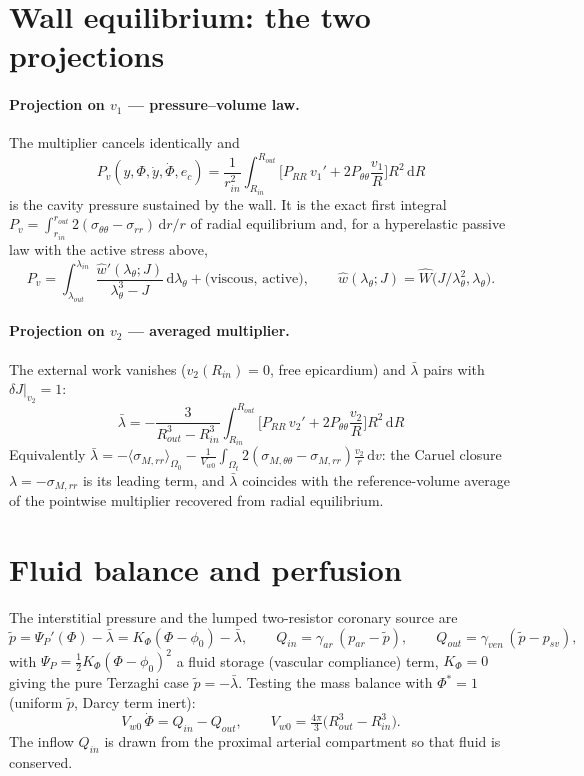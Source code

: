 \documentclass[11pt,a4paper]{article}
\newcommand{\dd}{\mathrm d}
\newcommand{\Rin}{R_{in}}
\newcommand{\Rout}{R_{out}}
\newcommand{\rin}{r_{in}}
\newcommand{\lt}{\lambda_\theta}
\newcommand{\lb}{\bar\lambda}
\newcommand{\pf}{\tilde p}
\newcommand{\Vw}{V_{w0}}
\begin{document}
\section{Wall equilibrium: the two projections}

\paragraph{Projection on $v_1$ --- pressure--volume law.} The multiplier cancels identically and
\begin{equation}
\boxed{\;P_v(y,\Phi,\dot y,\dot\Phi,e_c)=\frac1{\rin^2}\int_{\Rin}^{\Rout}\Big[P_{RR}\,v_1'+2P_{\theta\theta}\frac{v_1}{R}\Big]R^2\,\dd R\;}
\label{eq:pv}
\end{equation}
is the cavity pressure sustained by the wall. It is the exact first integral $P_v=\int_{\rin}^{r_{out}}2(\sigma_{\theta\theta}-\sigma_{rr})\,\dd r/r$ of radial equilibrium and, for a hyperelastic passive law with the active stress above,
\[
P_v=\int_{\lambda_{out}}^{\lambda_{in}}\frac{\widehat w'(\lt;J)}{\lt^3-J}\,\dd\lt+\text{(viscous, active)},\qquad \widehat w(\lt;J)=\widehat W\!\big(J/\lt^2,\lt\big).
\]
\paragraph{Projection on $v_2$ --- averaged multiplier.} The external work vanishes ($v_2(\Rin)=0$, free epicardium) and $\lb$ pairs with $\delta J|_{v_2}=1$:
\begin{equation}
\boxed{\;\lb=-\frac{3}{\Rout^3-\Rin^3}\int_{\Rin}^{\Rout}\Big[P_{RR}\,v_2'+2P_{\theta\theta}\frac{v_2}{R}\Big]R^2\,\dd R\;}
\label{eq:lambda}
\end{equation}
Equivalently $\lb=-\langle\sigma_{M,rr}\rangle_{\Omega_0}-\frac1{\Vw}\int_{\Omega_t}2(\sigma_{M,\theta\theta}-\sigma_{M,rr})\frac{v_2}{r}\,\dd v$: the Caruel closure $\lambda=-\sigma_{M,rr}$ is its leading term, and $\lb$ coincides with the reference-volume average of the pointwise multiplier recovered from radial equilibrium.

\section{Fluid balance and perfusion}

The interstitial pressure and the lumped two-resistor coronary source are
\begin{equation}
\pf=\Psi_P'(\Phi)-\lb=K_\Phi(\Phi-\phi_0)-\lb,\qquad
Q_{in}=\gamma_{ar}\,(p_{ar}-\pf),\qquad Q_{out}=\gamma_{ven}\,(\pf-p_{sv}),
\end{equation}
with $\Psi_P=\tfrac12K_\Phi(\Phi-\phi_0)^2$ a fluid storage (vascular compliance) term, $K_\Phi=0$ giving the pure Terzaghi case $\pf=-\lb$. Testing the mass balance with $\Phi^*=1$ (uniform $\pf$, Darcy term inert):
\begin{equation}
\boxed{\;\Vw\,\dot\Phi=Q_{in}-Q_{out},\qquad \Vw=\tfrac{4\pi}{3}\big(\Rout^3-\Rin^3\big).\;}
\label{eq:fluid}
\end{equation}
The inflow $Q_{in}$ is drawn from the proximal arterial compartment so that fluid is conserved.
\end{document}
